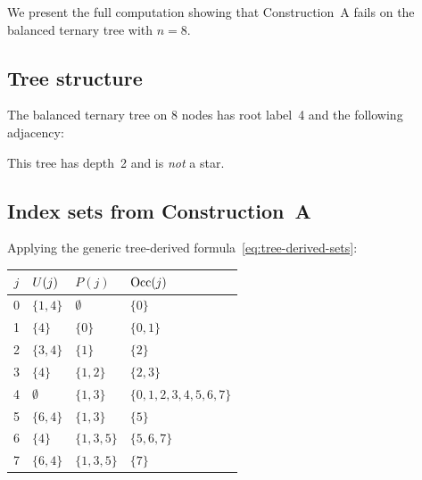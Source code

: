 
We present the full computation showing that Construction~A fails on
the balanced ternary tree with $n = 8$.

\subsection*{Tree structure}

The balanced ternary tree on 8 nodes has root label~4 and the
following adjacency:
\begin{center}
\end{center}

This tree has depth~2 and is \emph{not} a star.

\subsection*{Index sets from Construction~A}

Applying the generic tree-derived formula~\eqref{eq:tree-derived-sets}:
\begin{center}
\begin{tabular}{@{}clll@{}}
\toprule
$j$ & $U(j)$ & $P(j)$ & $\mathrm{Occ}(j)$ \\
\midrule
0 & $\{1, 4\}$       & $\emptyset$     & $\{0\}$ \\
1 & $\{4\}$           & $\{0\}$         & $\{0, 1\}$ \\
2 & $\{3, 4\}$       & $\{1\}$         & $\{2\}$ \\
3 & $\{4\}$           & $\{1, 2\}$     & $\{2, 3\}$ \\
4 & $\emptyset$       & $\{1, 3\}$     & $\{0,1,2,3,4,5,6,7\}$ \\
5 & $\{6, 4\}$       & $\{1, 3\}$     & $\{5\}$ \\
6 & $\{4\}$           & $\{1, 3, 5\}$ & $\{5, 6, 7\}$ \\
7 & $\{6, 4\}$       & $\{1, 3, 5\}$ & $\{7\}$ \\
\bottomrule
\end{tabular}
\end{center}

